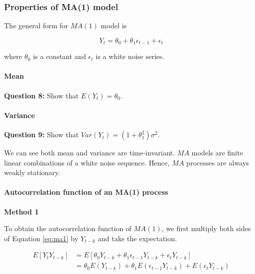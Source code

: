 \documentclass[]{book}
\let\oldparagraph\paragraph
\renewcommand{\paragraph}[1]{\oldparagraph{#1}\mbox{}}
\begin{document}
\hypertarget{properties-of-ma1-model}{%
\subsubsection{Properties of MA(1) model}\label{properties-of-ma1-model}}

The general form for \(MA(1)\) model is

\begin{equation}
  \label{eq:ma1}
Y_t = \theta_0 + \theta_1 \epsilon_{t-1} + \epsilon_t
\end{equation}

where \(\theta_0\) is a constant and \({\epsilon_t}\) is a white noise series.

\hypertarget{mean-3}{%
\paragraph{Mean}\label{mean-3}}

\textbf{Question 8:} Show that \(E(Y_t) = \theta_0\).

\hypertarget{variance-2}{%
\paragraph{Variance}\label{variance-2}}

\textbf{Question 9:} Show that \(Var(Y_t) = (1+\theta_1^2)\sigma^2\).

We can see both mean and variance are time-invariant. \(MA\) models are finite linear combinations of a white noise sequence. Hence, \(MA\) processes are always weakly stationary.

\hypertarget{autocorrelation-function-of-an-ma1-process}{%
\paragraph{Autocorrelation function of an MA(1) process}\label{autocorrelation-function-of-an-ma1-process}}

\textbf{Method 1}

To obtain the autocorrelation function of \(MA(1)\), we first multiply both sides of Equation \eqref{eq:ma1} by \(Y_{t-k}\) and take the expectation.

\begin{equation}
\label{eq: ma1acfs1}
\begin{aligned}
E[Y_tY_{t-k}] &= E[\theta_0 Y_{t-k} + \theta_1 \epsilon_{t-1} Y_{t-k} + \epsilon_t Y_{t-k}]\\
&= \theta_0 E(Y_{t-k}) + \theta_1 E(\epsilon_{t-1}Y_{t-k}) + E(\epsilon_t Y_{t-k})\\
\end{aligned}
\end{equation}
\end{document}
